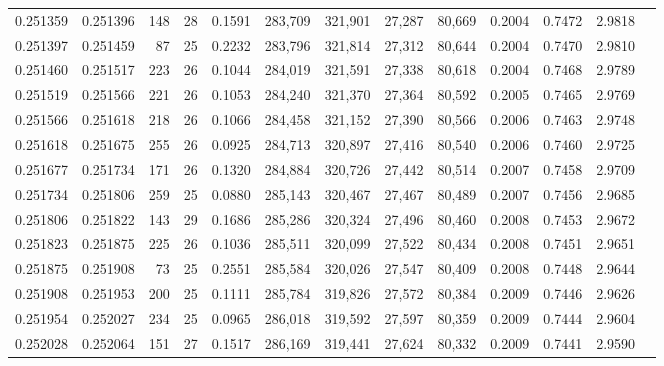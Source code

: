 \begin{tabular}{rrrrrrrrrrrrr}
0.251359 & 0.251396 &   148 &  28 &                                     0.1591 & 283,709 & 321,901 &  27,287 &  80,669 & 0.2004 & 0.7472 & 2.9818 \\
0.251397 & 0.251459 &    87 &  25 &                                     0.2232 & 283,796 & 321,814 &  27,312 &  80,644 & 0.2004 & 0.7470 & 2.9810 \\
0.251460 & 0.251517 &   223 &  26 &                                     0.1044 & 284,019 & 321,591 &  27,338 &  80,618 & 0.2004 & 0.7468 & 2.9789 \\
0.251519 & 0.251566 &   221 &  26 &                                     0.1053 & 284,240 & 321,370 &  27,364 &  80,592 & 0.2005 & 0.7465 & 2.9769 \\
0.251566 & 0.251618 &   218 &  26 &                                     0.1066 & 284,458 & 321,152 &  27,390 &  80,566 & 0.2006 & 0.7463 & 2.9748 \\
0.251618 & 0.251675 &   255 &  26 &                                     0.0925 & 284,713 & 320,897 &  27,416 &  80,540 & 0.2006 & 0.7460 & 2.9725 \\
0.251677 & 0.251734 &   171 &  26 &                                     0.1320 & 284,884 & 320,726 &  27,442 &  80,514 & 0.2007 & 0.7458 & 2.9709 \\
0.251734 & 0.251806 &   259 &  25 &                                     0.0880 & 285,143 & 320,467 &  27,467 &  80,489 & 0.2007 & 0.7456 & 2.9685 \\
0.251806 & 0.251822 &   143 &  29 &                                     0.1686 & 285,286 & 320,324 &  27,496 &  80,460 & 0.2008 & 0.7453 & 2.9672 \\
0.251823 & 0.251875 &   225 &  26 &                                     0.1036 & 285,511 & 320,099 &  27,522 &  80,434 & 0.2008 & 0.7451 & 2.9651 \\
0.251875 & 0.251908 &    73 &  25 &                                     0.2551 & 285,584 & 320,026 &  27,547 &  80,409 & 0.2008 & 0.7448 & 2.9644 \\
0.251908 & 0.251953 &   200 &  25 &                                     0.1111 & 285,784 & 319,826 &  27,572 &  80,384 & 0.2009 & 0.7446 & 2.9626 \\
0.251954 & 0.252027 &   234 &  25 &                                     0.0965 & 286,018 & 319,592 &  27,597 &  80,359 & 0.2009 & 0.7444 & 2.9604 \\
0.252028 & 0.252064 &   151 &  27 &                                     0.1517 & 286,169 & 319,441 &  27,624 &  80,332 & 0.2009 & 0.7441 & 2.9590 \\

\end{tabular}
